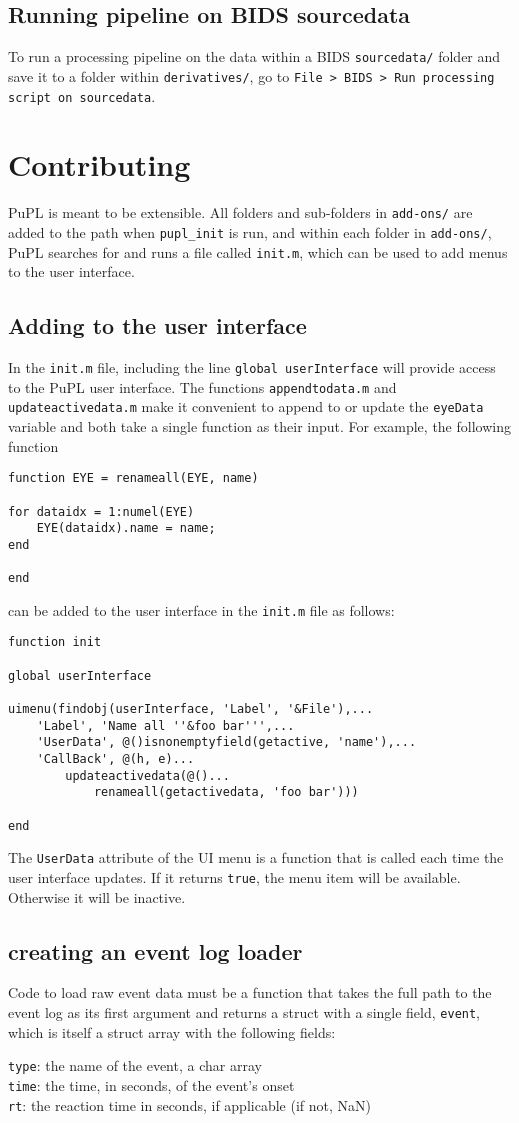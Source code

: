 \documentclass{article}
\begin{document}
\subsection{Running pipeline on BIDS sourcedata}
To run a processing pipeline on the data within a BIDS \texttt{sourcedata/} folder and save it to a folder within \texttt{derivatives/}, go to \texttt{File > BIDS > Run processing script on sourcedata}.
\section{Contributing}
PuPL is meant to be extensible. All folders and sub-folders in \texttt{add-ons/} are added to the path when \texttt{pupl\_init} is run, and within each folder in \texttt{add-ons/}, PuPL searches for and runs a file called \texttt{init.m}, which can be used to add menus to the user interface.
\subsection{Adding to the user interface}
In the \texttt{init.m} file, including the line \texttt{global userInterface} will provide access to the PuPL user interface. The functions \texttt{appendtodata.m} and \texttt{updateactivedata.m} make it convenient to append to or update the \texttt{eyeData} variable and both take a single function as their input. For example, the following function
\begin{verbatim}
function EYE = renameall(EYE, name)

for dataidx = 1:numel(EYE)
    EYE(dataidx).name = name;
end

end
\end{verbatim}
can be added to the user interface in the \texttt{init.m} file as follows:
\begin{verbatim}
function init

global userInterface

uimenu(findobj(userInterface, 'Label', '&File'),...
    'Label', 'Name all ''&foo bar''',...
    'UserData', @()isnonemptyfield(getactive, 'name'),...
    'CallBack', @(h, e)...
        updateactivedata(@()...
            renameall(getactivedata, 'foo bar')))

end
\end{verbatim}
The \texttt{UserData} attribute of the UI menu is a function that is called each time the user interface updates. If it returns \texttt{true}, the menu item will be available. Otherwise it will be inactive.
\subsection{creating an event log loader} \label{event_log_loader}
Code to load raw event data must be a function that takes the full path to the event log as its first argument and returns a struct with a single field, \texttt{event}, which is itself a struct array with the following fields:
\begin{addmargin}[1em]{0em}
\texttt{type}: the name of the event, a char array\\
\texttt{time}: the time, in seconds, of the event's onset\\
\texttt{rt}: the reaction time in seconds, if applicable (if not, NaN)
\end{addmargin}
\end{document}
